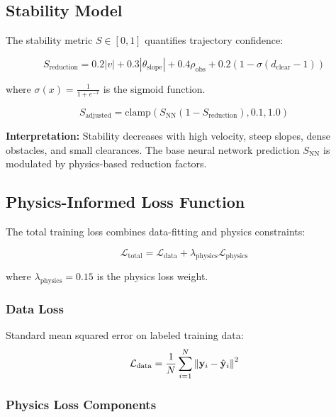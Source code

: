 \subsection{Stability Model}

The stability metric $S \in [0, 1]$ quantifies trajectory confidence:

\begin{equation}
S_{\text{reduction}} = 0.2|v| + 0.3|\theta_{\text{slope}}| + 0.4\rho_{\text{obs}} + 0.2\left(1 - \sigma(d_{\text{clear}} - 1)\right)
\label{eq:stability_reduction}
\end{equation}

where $\sigma(x) = \frac{1}{1 + e^{-x}}$ is the sigmoid function.

\begin{equation}
S_{\text{adjusted}} = \text{clamp}\left( S_{\text{NN}} (1 - S_{\text{reduction}}), 0.1, 1.0 \right)
\label{eq:stability_adjusted}
\end{equation}

\textbf{Interpretation:} Stability decreases with high velocity, steep slopes, dense obstacles, and small clearances. The base neural network prediction $S_{\text{NN}}$ is modulated by physics-based reduction factors.

\subsection{Physics-Informed Loss Function}

The total training loss combines data-fitting and physics constraints:

\begin{equation}
\mathcal{L}_{\text{total}} = \mathcal{L}_{\text{data}} + \lambda_{\text{physics}} \mathcal{L}_{\text{physics}}
\label{eq:total_loss}
\end{equation}

where $\lambda_{\text{physics}} = 0.15$ is the physics loss weight.

\subsubsection{Data Loss}
Standard mean squared error on labeled training data:
\begin{equation}
\mathcal{L}_{\text{data}} = \frac{1}{N} \sum_{i=1}^N \left\| \mathbf{y}_i - \hat{\mathbf{y}}_i \right\|^2
\label{eq:data_loss}
\end{equation}

\subsubsection{Physics Loss Components}

